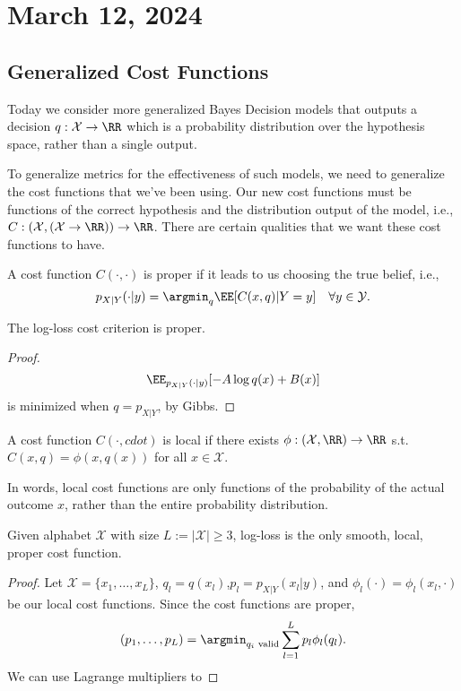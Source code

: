 \section{March 12, 2024}

\subsection{Generalized Cost Functions}

Today we consider more generalized Bayes Decision models that outputs a decision $q: \mathcal{X}\rightarrow \RR$ which is a probability distribution over the hypothesis space, rather than a single output. 

To generalize metrics for the effectiveness of such models, we need to generalize the cost functions that we've been using. Our new cost functions must be functions of the correct hypothesis and the distribution output of the model, i.e., $C: (\mathcal{X}, (\mathcal{X}\rightarrow \RR))\rightarrow \RR$. There are certain qualities that we want these cost functions to have. 

\begin{definition}

A cost function $C(\cdot, \cdot)$ is \ac{proper} if it leads to us choosing the true belief, i.e., 
\[p_{X|Y}(\cdot | y) = \argmin_{q}\EE[C(x,q)|Y=y]\quad \forall y\in \mathcal{Y}.\] 
\end{definition}

\begin{theorem}
\claimlabel

The log-loss cost criterion is proper.
\end{theorem}

\begin{proof}
	\[\EE_{p_{X|Y}(\cdot | y)}[-A\log q(x) + B(x)]\]
is minimized when $q = p_{X|Y}$, by Gibbs.
\end{proof}

\begin{definition}

A cost function $C(\cdot, cdot)$ is \ac{local} if there exists $\phi: (\mathcal{X}, \RR)\rightarrow \RR$ s.t. $C(x,q) = \phi(x,q(x))$ for all $x\in \mathcal{X}$.
\end{definition}

In words, local cost functions are only functions of the probability of the actual outcome $x$, rather than the entire probability distribution. 

\begin{theorem}
\thmlabel

Given alphabet $\mathcal{X}$ with size $L := \vert \mathcal{X}\vert\geq 3$, log-loss is the only smooth, local, proper cost function.
\end{theorem}

\begin{proof}
	Let $\mathcal{X} = \{x_1,\hdots, x_L\}$, $q_l = q(x_l)$,$p_l = p_{X|Y}(x_l|y)$, and $\phi_l(\cdot) = \phi_l(x_l,\cdot)$ be our local cost functions. Since the cost functions are proper, 
	\[(p_1,\hdots,p_L) = \argmin_{q_i\text{ valid}} \sum_{l=1}^L p_l\phi_l(q_l).\] 
We can use Lagrange multipliers to 
\end{proof}
